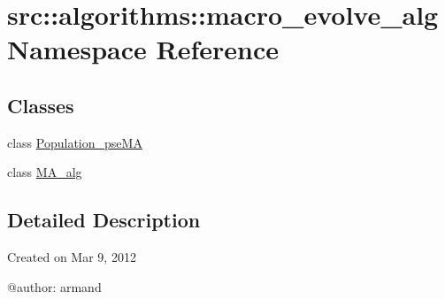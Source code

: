 \hypertarget{namespacesrc_1_1algorithms_1_1macro__evolve__alg}{
\section{src::algorithms::macro\_\-evolve\_\-alg Namespace Reference}
\label{namespacesrc_1_1algorithms_1_1macro__evolve__alg}
}
\subsection*{Classes}
\begin{DoxyCompactItemize}
\item 
class \hyperlink{classsrc_1_1algorithms_1_1macro__evolve__alg_1_1Population__pseMA}{Population\_\-pseMA}
\item 
class \hyperlink{classsrc_1_1algorithms_1_1macro__evolve__alg_1_1MA__alg}{MA\_\-alg}
\end{DoxyCompactItemize}


\subsection{Detailed Description}
\begin{DoxyVerb}
Created on Mar 9, 2012

@author: armand
\end{DoxyVerb}
 